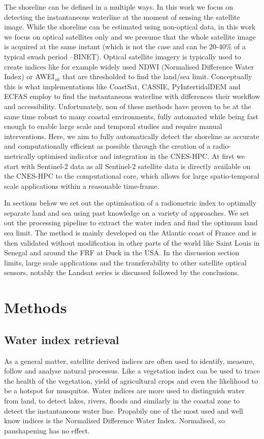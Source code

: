 \documentclass[remotesensing,article,submit,pdftex,moreauthors]{Definitions/mdpi}
\begin{document}
The shoreline can be defined in a multiple ways. In this work we focus on detecting the instantaneous waterline at the moment of sensing the satellite image. While the shoreline can be estimated using non-optical data, in this work we focus on optical satellites only and we presume that the whole satellite image is acquired at the same instant (which is not the case and can be 20-40\% of a typical swash period --BINET). Optical satellite imagery is typically used to create indices like for example widely used NDWI (Normalised Difference Water Index) or AWEI$_{sh}$ that are thresholded to find the land/sea limit. Conceptually this is what implementations like CoastSat, CASSIE, PyIntertidalDEM and ECFAS employ to find the instantaneous waterline with differences their workflow and accessibility. Unfortunately, non of these methods have proven to be at the same time robust to many coastal environments, fully automated while being fast enough to enable large scale and temporal studies and require manual interventions. Here, we aim to fully automatically detect the shoreline as accurate and computationally efficient as possible through the creation of a radio-metrically optimised indicator and integration in the CNES-HPC. At first we start with Sentinel-2 data as all Sentinel-2 satellite data is directly available on the CNES-HPC to the computational core, which allows for large spatio-temporal scale applications within a reasonable time-frame.

In sections below we set out the optimisation of a radiometric index to optimally separate land and sea using past knowledge on a variety of approaches. We set out the processing pipeline to extract the water index and find the optimum land sea limit. The method is mainly developed on the Atlantic coast of France and is then validated without modification in other parts of the world like Saint Louis in Senegal and around the FRF at Duck in the USA. In the discussion section limits, large scale applications and the transferability to other satellite optical sensors, notably the Landsat series is discussed followed by the conclusions.

\section{Methods}
\subsection{Water index retrieval}
As a general matter, satellite derived indices are often used to identify, measure, follow and analyse natural processus. Like a vegetation index can be used to trace the health of the vegetation, yield of agricultural crops and even the likelihood to be a hotspot for musquitos. Water indices are more used to distinguish water from land, to detect lakes, rivers, floods and similarly in the coastal zone to detect the instantaneous water line. Propabily one of the most used and well know indices is the Normalised Difference Water Index. Normalised, so panshapening has no effect.
\end{document}
